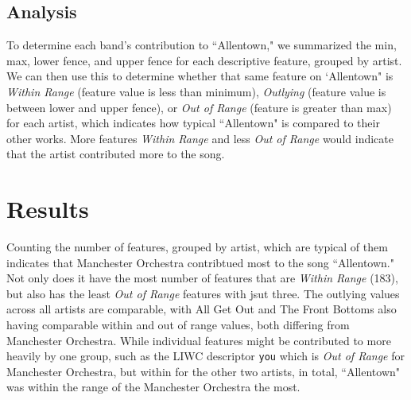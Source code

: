 \documentclass{article}\usepackage[]{graphicx}\usepackage[]{xcolor}
\makeatletter
\newenvironment{kframe}{%
 \def\at@end@of@kframe{}%
 \ifinner\ifhmode%
  \def\at@end@of@kframe{\end{minipage}}%
  \begin{minipage}{\columnwidth}%
 \fi\fi%
 \def\FrameCommand##1{\hskip\@totalleftmargin \hskip-\fboxsep
 \colorbox{shadecolor}{##1}\hskip-\fboxsep
     \hskip-\linewidth \hskip-\@totalleftmargin \hskip\columnwidth}%
 \MakeFramed {\advance\hsize-\width
   \@totalleftmargin\z@ \linewidth\hsize
   \@setminipage}}%
 {\par\unskip\endMakeFramed%
 \at@end@of@kframe}
\newenvironment{knitrout}{}{} %
\makeatother
\begin{document}
\begin{multicols}{2}
\subsection{Analysis}
To determine each band's contribution to ``Allentown," we summarized the min, max, lower fence, and upper fence for each descriptive feature, grouped by artist. We can then use this to determine whether that same feature on `Allentown" is \emph{Within Range} (feature value is less than minimum), \emph{Outlying} (feature value is between lower and upper fence), or \emph{Out of Range} (feature is greater than max) for each artist, which indicates how typical ``Allentown" is compared to their other works. More features \emph{Within Range} and less \emph{Out of Range} would indicate that the artist contributed more to the song. 


\section{Results}
Counting the number of features, grouped by artist, which are typical of them indicates that Manchester Orchestra contribtued most to the song ``Allentown." Not only does it have the most number of features that are \emph{Within Range} (183), but also has the least \emph{Out of Range} features with jsut three. The outlying values across all artists are comparable, with All Get Out and The Front Bottoms also having comparable within and out of range values, both differing from Manchester Orchestra. While individual features might be contributed to more heavily by one group, such as the LIWC descriptor \texttt{you} which is \emph{Out of Range} for Manchester Orchestra, but within for the other two artists, in total, ``Allentown" was within the range of the Manchester Orchestra the most.




\begin{knitrout}
\color{fgcolor}\begin{kframe}


{\ttfamily\noindent\bfseries\color{errorcolor}{\#\# Error: object 'my\_data\_frame' not found}}

{\ttfamily\noindent\bfseries\color{errorcolor}{\#\# Error: object 'my\_data\_long' not found}}\end{kframe}
\end{knitrout}
\begin{figure}[ht]
  \begin{center}
\begin{knitrout}
\color{fgcolor}\begin{kframe}



\end{kframe}
\end{knitrout}
\end{center}
\end{figure}
\end{multicols}
\end{document}
